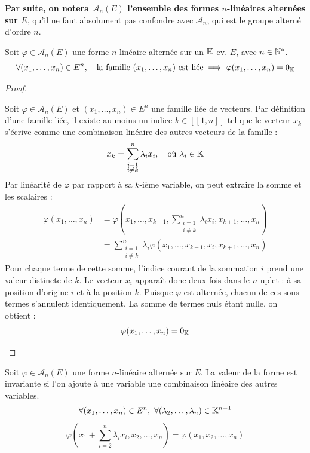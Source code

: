 \documentclass[12pt, a4paper]{report}
\begin{document}
\textbf{Par suite, on notera $\mathscr{A}_n(E)$ l'ensemble des formes $n$-linéaires alternées sur $E$}, qu'il ne faut absolument pas confondre avec $\mathcal{A}_n$, qui est le groupe alterné d'ordre $n$.

\begin{property}
    Soit $\varphi \in \mathscr A_n(E)$ une forme $n$-linéaire alternée sur un $\mathbb{K}$-ev. $E$, avec $n \in \mathbb{N}^*$.
    $$\forall (x_1, \dots, x_n) \in E^n, \quad \text{la famille } (x_1, \dots, x_n) \text{ est liée} \implies \varphi(x_1, \dots, x_n) = 0_{\mathbb{K}}$$
\end{property}

\begin{proof}
    \begin{outline}
        \1 Soit $\varphi \in \mathscr A_n(E)$ et $(x_1, \dots, x_n) \in E^n$ une famille liée de vecteurs.
        \1 Par définition d'une famille liée, il existe au moins un indice $k \in [\![1,n]\!]$ tel que le vecteur $x_k$ s'écrive comme une combinaison linéaire des autres vecteurs de la famille :
        $$x_k = \sum_{\substack{i=1 \\ i \ne k}}^n \lambda_i x_i, \quad \text{où } \lambda_i \in \mathbb{K}$$
        \1 Par linéarité de $\varphi$ par rapport à sa $k$-ième variable, on peut extraire la somme et les scalaires :
        \begin{align*}
            \varphi(x_1, \dots, x_n) &= \varphi\left(x_1, \dots, x_{k-1}, \sum_{\substack{i=1 \\ i \ne k}}^n \lambda_i x_i, x_{k+1}, \dots, x_n\right) \\
            &= \sum_{\substack{i=1 \\ i \ne k}}^n \lambda_i \varphi(x_1, \dots, x_{k-1}, x_i, x_{k+1}, \dots, x_n)
        \end{align*}
        \1 Pour chaque terme de cette somme, l'indice courant de la sommation $i$ prend une valeur distincte de $k$. Le vecteur $x_i$ apparaît donc deux fois dans le $n$-uplet : à sa position d'origine $i$ et à la position $k$.
        \1 Puisque $\varphi$ est alternée, chacun de ces sous-termes s'annulent identiquement. La somme de termes nuls étant nulle, on obtient :
        $$\varphi(x_1, \dots, x_n) = 0_{\mathbb{K}}$$
    \end{outline}
\end{proof}

\begin{consequence}
    Soit $\varphi \in \mathscr A_n(E)$ une forme $n$-linéaire alternée sur $E$. La valeur de la forme est invariante si l'on ajoute à une variable une combinaison linéaire des autres variables.
    $$\forall (x_1, \dots, x_n) \in E^n, \ \forall (\lambda_2, \dots, \lambda_n) \in \mathbb{K}^{n-1}$$
    $$\varphi\left(x_1 + \sum_{i=2}^{n} \lambda_i x_i, x_2, \dots, x_n\right) = \varphi(x_1, x_2, \dots, x_n)$$
\end{consequence}
\end{document}
